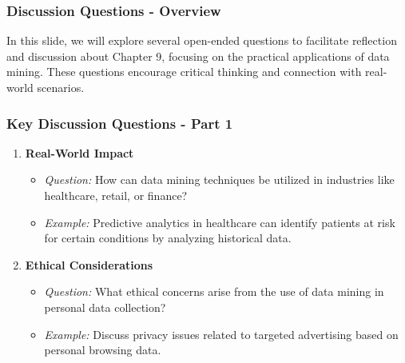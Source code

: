 \documentclass[aspectratio=169]{beamer}
\begin{document}
\begin{frame}[fragile]
    \frametitle{Discussion Questions - Overview}
    In this slide, we will explore several open-ended questions to facilitate reflection and discussion about Chapter 9, focusing on the practical applications of data mining. These questions encourage critical thinking and connection with real-world scenarios.
\end{frame}

\begin{frame}[fragile]
    \frametitle{Key Discussion Questions - Part 1}
    \begin{enumerate}
        \item \textbf{Real-World Impact}
            \begin{itemize}
                \item \textit{Question:} How can data mining techniques be utilized in industries like healthcare, retail, or finance?
                \item \textit{Example:} Predictive analytics in healthcare can identify patients at risk for certain conditions by analyzing historical data.
            \end{itemize}

        \item \textbf{Ethical Considerations}
            \begin{itemize}
                \item \textit{Question:} What ethical concerns arise from the use of data mining in personal data collection?
                \item \textit{Example:} Discuss privacy issues related to targeted advertising based on personal browsing data.
            \end{itemize}
    \end{enumerate}
\end{frame}
\end{document}
